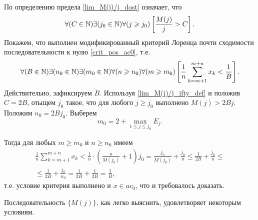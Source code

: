 По определению предела \eqref{lim_M(j)/j_dost} означает, что
\begin{equation}\label{lim_M(j)/j_ifty_def}
	\forall(C  \in\N)
	\exists(j_0\in\N)
	\forall(j \geq j_0)
	\left[
		\frac{M(j)}{j}>C
	\right]
	.
\end{equation}
Покажем, что выполнен модификированный критерий Лоренца почти сходимости последовательности к нулю
\eqref{crit_pos_ac0}, т.е.
\begin{equation}
	\forall(B  \in\N)
	\exists(n_0\in\N)
	\exists(m_0\in\N)
	\forall(n\geq n_0)
	\forall(m\geq m_0)
	\\
	\left[
		\frac{1}{n}
		\sum_{k=m+1}^{m+n} x_k
		<
		\frac{1}{B}
	\right]
	.
\end{equation} Действительно, зафиксируем $B$.
Используя \eqref{lim_M(j)/j_ifty_def} и положив $C=2B$,
отыщем $j_0$ такое, что для любого $j\geq j_0$ выполнено
$M(j)>2Bj$.
Положим $n_0 = 2Bj_0$.
Выберем
$$
	m_0 = 2+\max_{1\leq j \leq j_0} E_j
	.
$$

Тогда для любых $m\geq m_0$ и $n\geq n_0$ имеем
\begin{multline}
	\frac{1}{n} \sum_{k=m+1}^{m+n} x_k
	<
	\frac{1}{n} \cdot \left( \frac{n}{M(j_0)} + 1 \right) j_0
	=
	\frac{j_0}{M(j_0)} + \frac{j_0}{n}
	\leq
	\frac{1}{2B} + \frac{j_0}{n}
	\leq
	\\ \leq
	\frac{1}{2B} + \frac{j_0}{n_0}
	=
	\frac{1}{2B} + \frac{1}{2B}
	=
	\frac{1}{B}
	,
\end{multline}
т.е. условие критерия выполнено
и $x\in ac_0$,
что и требовалось доказать.

Последовательность $\{M(j)\}$, как легко выяснить, удовлетворяет некоторым условиям.
